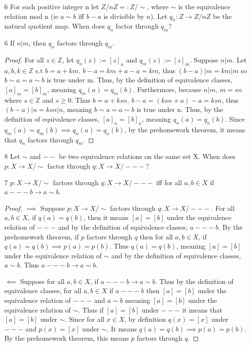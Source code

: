 \documentclass{article}
\newcommand{\Z}{\mathbb{Z}}
\newcommand{\rarr}[0]{\rightarrow}
\begin{document}
\begin{QU}{6}\label{Question 6.}
	For each positive integer n let  $Z/nZ =: Z/\sim$, where $\sim$ is the equivalence relation mod n (ie $a\sim b$ iff $b-a$ is divisible by $n$). Let $q_n: Z \rarr Z/nZ$ be the natural quotient map. When does $q_n$ factor through $q_m$?
\end{QU}
\begin{claim}{6}
	If $n | m$, then $q_n$ factors through $q_m$.
\end{claim}
\begin{proof}
	For all $z \in \Z$, let $q_n(z) := [z]_n$ and $q_m(z) := [z]_m$.
	Suppose $n | m$. Let $a, b, k \in \Z$ s.t $b = a + km$. $b - a = km + a - a = km$, thus $(b - a) |m = km | m$ so $b \sim a = a \sim b$ is true under m. Thus, by the definition of equivalence classes, $[a]_m = [b]_m$, meaning $q_m(a) = q_m(b)$. Furthermore, because $n | m$, $m = sn$ where $s \in \Z$ and $s \geq 0$. Thus $b = a + ksn$. $b - a = (ksn + a) - a = ksn$, thus $(b - a) | n = ksn | n$, meaning $b \sim a = a \sim b$ is true under n. Thus, by the definition of equivalence classes, $[a]_n = [b]_n$, meaning $q_n(a) = q_n(b)$. Since $q_m(a) = q_m(b) \implies q_n(a) = q_n(b)$, by the prehomework theorem, it means that $q_n$ factors through $q_m$.
\end{proof}

\begin{QU}{8}\label{Question 7.}
	Let $\sim$ and $--$ be two equivalence relations on the same set X. When does $p: X \rarr X/\sim$ factor through $q: X \rarr X/---$?
\end{QU}

\begin{claim}{7}
	$p: X \rarr X/\sim$ factors through $q: X \rarr X/---$ iff for all $a, b \in X$ if $a --- b \rarr a \sim b$.
\end{claim}
\begin{proof}
	$\implies$ Suppose $p: X \rarr X/\sim$ factors through $q: X \rarr X/---$. For all $a, b \in X$, if $q(a) = q(b)$, then it means $[a] = [b]$ under the equivalence relation of $---$ and by the definition of equivalence classes, $a --- b$. By the prehomework theorem, if $p$ factors through $q$ then for all $a, b \in X$, if $q(a) = q(b) \implies p(a) = p(b)$. Thus $q(a) = q(b)$, meaning $[a] = [b]$ under the equivalence relation of $\sim$ and by the definition of equivalence classes, $a \sim b$. Thus $a --- b \rarr a \sim b$.

	$\impliedby$ Suppose for all $a, b \in X$, if $a --- b \rarr a \sim b$. Thus by the definition of equivalence classes, for all $a, b \in X$ if $a --- b$ then $[a] = [b]$ under the equivalence relation of $---$ and $a \sim b$ meaning $[a] = [b]$ under the equivalence relation of $\sim$. Thus if $[a] = [b]$ under $---$ it means that $[a] = [b]$ under $\sim$. Since for all $x \in X$, by definition $q(x) = [x]$ under $---$ and $p(x) = [x]$ under $\sim$. It means $q(a) = q(b) \implies p(a) = p(b)$. By the prehomework theorem, this means $p$ factors through $q$.
\end{proof}
\end{document}
